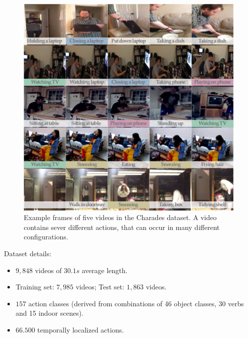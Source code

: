 \begin{figure}[H]
    \centering
    \includegraphics[width=\textwidth]{img_datasets/charades_example}
    \caption{Example frames of five videos in the Charades dataset. A video contains sever different actions, that can occur in many different configurations. \cite{sigurdsson_hollywood_2016}}
    \label{fig:charades_example}
\end{figure}

Dataset details:
\begin{itemize}
    \item $9,848$ videos of $30.1s$ average length.
    \item Training set: $7,985$ videos; Test set: $1,863$ videos.
    \item $157$ action classes (derived from combinations of 46 object classes, 30 verbs and 15 indoor scenes).
    \item $66.500$ temporally localized actions.
\end{itemize}


